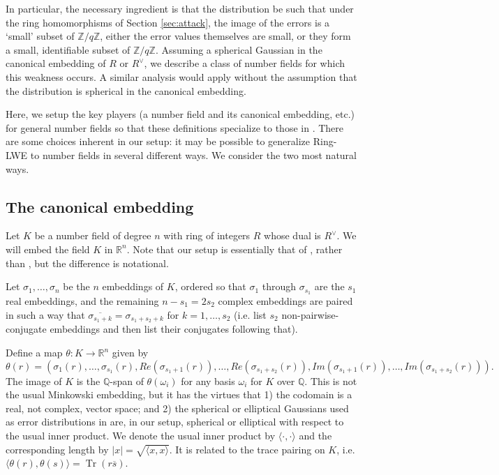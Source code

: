 \documentclass{llncs}
\newcommand{\QQ}{\mathbb{Q}}
\newcommand{\RR}{\mathbb{R}}
\newcommand{\ZZ}{\mathbb{Z}}
\newcommand{\<}{\langle}
\renewcommand{\>}{\rangle}
\begin{document}
In particular, the necessary ingredient is that the distribution be such that under the ring homomorphisms of Section \ref{sec:attack}, the image of the errors is a `small' subset of $\ZZ/q\ZZ$, either the error values themselves are small, or they form a small, identifiable subset of $\ZZ/q\ZZ$.  Assuming a spherical Gaussian in the canonical embedding of $R$ or $R^\vee$, we describe a class of number fields for which this weakness occurs.  A similar analysis would apply without the assumption that the distribution is spherical in the canonical embedding.





Here, we setup the key players (a number field and its canonical embedding, etc.) for general number fields so that these definitions specialize to those in \cite{LPR2}.  There are some choices inherent in our setup:  it may be possible to generalize Ring-LWE to number fields in several different ways.  We consider the two most natural ways.

\subsection{The canonical embedding}
\label{sec:embedding}
Let $K$ be a number field of degree $n$ with ring of integers $R$ whose dual is $R^\vee$.  We will embed the field $K$ in $\RR^n$.  Note that our setup is essentially that of \cite{DD12}, rather than \cite{LPR2}, but the difference is notational.

Let $\sigma_1, \ldots, \sigma_n$ be the $n$ embeddings of $K$, ordered %
so that $\sigma_1$ through $\sigma_{s_1}$ are the $s_1$ real embeddings, and the remaining $n-s_1 = 2s_2$ complex embeddings are paired in such a way that $\overline{\sigma_{s_1+k}} = \sigma_{s_1+s_2+k}$ for $k=1, \ldots, s_2$ (i.e. list $s_2$ non-pairwise-conjugate embeddings and then list their conjugates following that).

Define a map $\theta : K \rightarrow \RR^n$ given by
\[
\theta(r) = (\sigma_1(r), \ldots, \sigma_{s_1}(r), Re(\sigma_{s_1+1}(r)), \ldots, Re(\sigma_{s_1 + s_2}(r)), Im(\sigma_{s_1 + 1}(r)), \ldots, Im(\sigma_{s_1+s_2}(r)) ).
\]
The image of $K$ is the $\QQ$-span of $\theta(\omega_i)$ for any basis $\omega_i$ for $K$ over $\QQ$.  This is not the usual Minkowski embedding, but it has the virtues that 1) the codomain is a real, not complex, vector space; and 2) the spherical or elliptical Gaussians used as error distributions in \cite{LPR2} are, in our setup, spherical or elliptical with respect to the usual inner product.   We denote the usual inner product by $\langle \cdot, \cdot \rangle$ and the corresponding length by $|x| = \sqrt{\langle x, x \rangle}$.  It is related to the trace pairing on $K$, i.e. $\langle \theta(r), \theta(s) \rangle = \operatorname{Tr}(r\overline{s})$.
\end{document}

